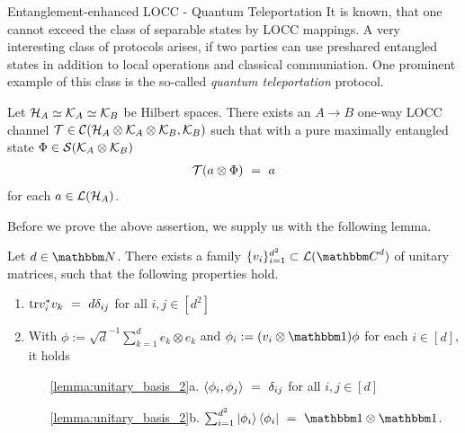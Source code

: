 \begin{subsection}{Entanglement-enhanced LOCC - Quantum Teleportation}
It is known, that one cannot exceed the class of separable states by LOCC mappings. A very interesting class of protocols arises, if two parties can use preshared entangled states in addition to local operations and classical communiation. One prominent example of this class is the so-called \emph{quantum teleportation} protocol. 
\begin{theorem}\label{thm:teleportation} 
Let ${\mathcal H}_A \simeq {\mathcal K}_A \simeq {\mathcal K}_B$ be Hilbert spaces. There exists an $A \rightarrow B$ one-way LOCC channel ${\mathcal T} \in {\mathcal C}({\mathcal H}_A \otimes {\mathcal K}_A \otimes {\mathcal K}_B, {\mathcal K}_B)$ such that with a pure maximally entangled state
$\Phi \in {\mathcal S}({\mathcal K}_A \otimes {\mathcal K}_B)$
\begin{align}
{\mathcal T}(a \otimes \Phi) \ = \ a \label{thm:teleportation_1}
\end{align}
for each $a \in {\mathcal L}({\mathcal H}_A)$. 	
\end{theorem}
Before we prove the above assertion, we supply us with the following lemma.
\begin{lemma}\label{lemma:unitary_basis}
Let $d \in \bbmN$. There exists a family $\{v_i\}_{i=1}^{d^2} \subset \cL(\bbmC^d)$ of unitary matrices, such that the following properties hold. 
\begin{enumerate}
	\item $\mathrm{tr} v_i^\ast v_k \ = \ d \delta_{ij}$ for all $i,j \in [d^2]$
	\item With $\phi := \sqrt{d}^{-1} \sum_{k=1}^d e_k \otimes e_k$ and $\phi_i := (v_i\otimes \bbmeins)\phi$ for each $i \in [d]$, it holds  \label{lemma:unitary_basis_2}
	\begin{enumerate}
		\item[\ref{lemma:unitary_basis_2}a.] $\braket{\phi_i, \phi_j}  \ = \ \delta_{ij}$ for all $i,j \in [d]$
		\item[\ref{lemma:unitary_basis_2}b.] $\sum_{i=1}^{d^2} \ket{\phi_i}\bra{\phi_i} \ = \ \bbmeins \otimes \bbmeins$.
	\end{enumerate}
\end{enumerate}
\end{lemma}


\end{subsection}
